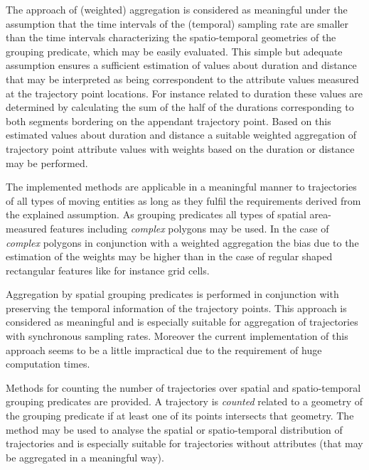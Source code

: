 \documentclass[12pt, oneside, a4paper]{scrbook}
\begin{document}
The approach of (weighted) aggregation is considered as meaningful under the assumption that the time intervals of the (temporal) sampling rate are smaller than the time intervals characterizing the spatio-temporal geometries of the grouping predicate, which may be easily evaluated.
This simple but adequate assumption ensures a sufficient estimation of values about duration and distance that may be interpreted as being correspondent to the attribute values measured at the trajectory point locations. 
For instance related to duration these values are determined by calculating the sum of the half of the durations corresponding to both segments bordering on the appendant trajectory point.
Based on this estimated values about duration and distance a suitable weighted aggregation of trajectory point attribute values with weights based on the duration or distance may be performed.
\par\medskip

The implemented methods are applicable in a meaningful manner to trajectories of all types of moving entities as long as they fulfil the requirements derived from the explained assumption. 
As grouping predicates all types of spatial area-measured features including \textit{complex} polygons may be used.
In the case of \textit{complex} polygons in conjunction with a weighted aggregation the bias due to the estimation of the weights may be higher than in the case of regular shaped rectangular features like for instance grid cells.
\par\medskip

Aggregation by spatial grouping predicates is performed in conjunction with preserving the temporal information of the trajectory points. This approach is considered as meaningful and is especially suitable for aggregation of trajectories with synchronous sampling rates. Moreover the current implementation of this approach seems to be a little impractical due to the requirement of huge computation times.
\par\medskip

Methods for counting the number of trajectories over spatial and spatio-temporal grouping predicates are provided. A trajectory is \textit{counted} related to a geometry of the grouping predicate if at least one of its points intersects that geometry. The method may be used to analyse the spatial or spatio-temporal distribution of trajectories and is especially suitable for trajectories without attributes (that may be aggregated in a meaningful way).
\par\medskip
\end{document}
